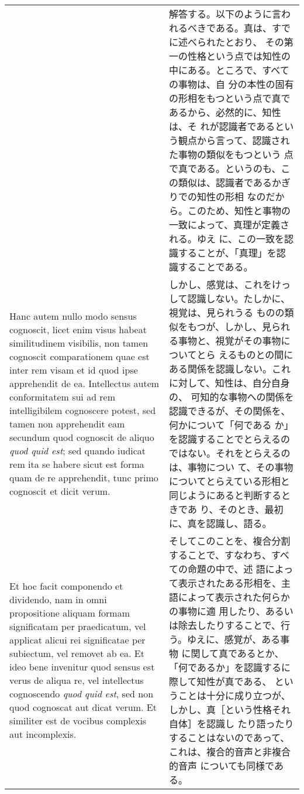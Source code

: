 \documentclass[10pt]{jsarticle} %
\begin{document}
\begin{longtable}{p{21em}p{21em}}
& 

解答する。以下のように言われるべきである。真は、すでに述べられたとおり、
その第一の性格という点では知性の中にある。ところで、すべての事物は、自
分の本性の固有の形相をもつという点で真であるから、必然的に、知性は、そ
れが認識者であるという観点から言って、認識された事物の類似をもつという
点で真である。というのも、この類似は、認識者であるかぎりでの知性の形相
なのだから。このため、知性と事物の一致によって、真理が定義される。ゆえ
に、この一致を認識することが、「真理」を認識することである。


\\


Hanc autem nullo modo sensus cognoscit, licet enim visus habeat
similitudinem visibilis, non tamen cognoscit comparationem quae est
inter rem visam et id quod ipse apprehendit de ea. Intellectus autem
conformitatem sui ad rem intelligibilem cognoscere potest, sed tamen
non apprehendit eam secundum quod cognoscit de aliquo {\itshape quod
quid est}; sed quando iudicat rem ita se habere sicut est forma quam
de re apprehendit, tunc primo cognoscit et dicit verum.


&

しかし、感覚は、これをけっして認識しない。たしかに、視覚は、見られうる
ものの類似をもつが、しかし、見られる事物と、視覚がその事物についてとら
えるものとの間にある関係を認識しない。これに対して、知性は、自分自身の、
可知的な事物への関係を認識できるが、その関係を、何かについて「何である
か」を認識することでとらえるのではない。それをとらえるのは、事物につい
て、その事物についてとらえている形相と同じようにあると判断するときであ
り、そのとき、最初に、真を認識し、語る。


\\


Et hoc facit componendo et dividendo, nam in omni propositione aliquam
formam significatam per praedicatum, vel applicat alicui rei
significatae per subiectum, vel removet ab ea. Et ideo bene invenitur
quod sensus est verus de aliqua re, vel intellectus cognoscendo
{\itshape quod quid est}, sed non quod cognoscat aut dicat verum. Et
similiter est de vocibus complexis aut incomplexis.


&

そしてこのことを、複合分割することで、すなわち、すべての命題の中で、述
語によって表示されたある形相を、主語によって表示された何らかの事物に適
用したり、あるいは除去したりすることで、行う。ゆえに、感覚が、ある事物
に関して真であるとか、「何であるか」を認識するに際して知性が真である、
ということは十分に成り立つが、しかし、真［という性格それ自体］を認識し
たり語ったりすることはないのであって、これは、複合的音声と非複合的音声
についても同様である。


\end{longtable}
\end{document}
